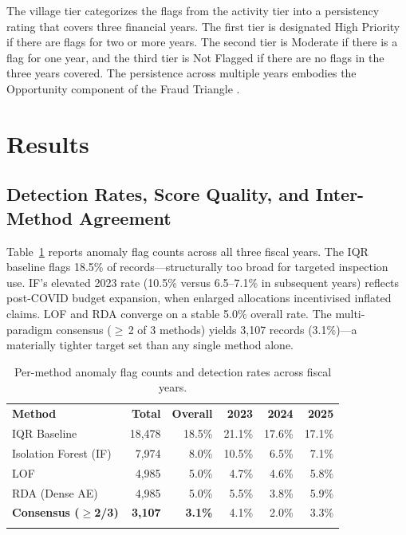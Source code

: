 \documentclass[3p,times,procedia]{elsarticle}
\begin{document}
The village tier categorizes the flags from the activity tier into a persistency rating that covers three financial years. The first tier is designated High Priority if there are flags for two or more years. The second tier is Moderate if there is a flag for one year, and the third tier is Not Flagged if there are no flags in the three years covered. The persistence across multiple years embodies the Opportunity component of the Fraud Triangle \cite{ref21}.

\section{Results}
\label{sec:results}

\subsection{Detection Rates, Score Quality, and Inter-Method Agreement}

Table~\ref{tab:rates} reports anomaly flag counts across all three fiscal years. The IQR baseline flags 18.5\% of records---structurally too broad for targeted inspection use. IF's elevated 2023 rate (10.5\% versus 6.5--7.1\% in subsequent years) reflects post-COVID budget expansion, when enlarged allocations incentivised inflated claims. LOF and RDA converge on a stable 5.0\% overall rate. The multi-paradigm consensus ($\geq$\,2 of 3 methods) yields 3,107 records (3.1\%)---a materially tighter target set than any single method alone.

\begin{table}[htb]
\caption{Per-method anomaly flag counts and detection rates across fiscal years.}
\label{tab:rates}
\begin{tabular*}{\hsize}{@{\extracolsep{\fill}}lrrrrr@{}}
\toprule
\textbf{Method} & \textbf{Total} & \textbf{Overall} & \textbf{2023} & \textbf{2024} & \textbf{2025} \\
\colrule
IQR Baseline                   & 18,478 & 18.5\% & 21.1\% & 17.6\% & 17.1\% \\
Isolation Forest (IF)          &  7,974 &  8.0\% & 10.5\% &  6.5\% &  7.1\% \\
LOF                            &  4,985 &  5.0\% &  4.7\% &  4.6\% &  5.8\% \\
RDA (Dense AE)                 &  4,985 &  5.0\% &  5.5\% &  3.8\% &  5.9\% \\
\textbf{Consensus ($\geq$2/3)} & \textbf{3,107} & \textbf{3.1\%} & 4.1\% & 2.0\% & 3.3\% \\
\botrule
\end{tabular*}
\end{table}
\end{document}
